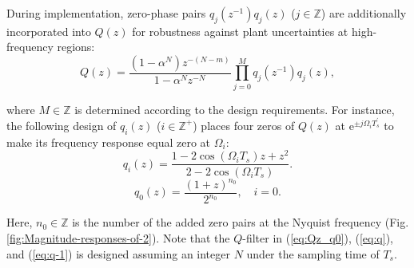 \documentclass [11pt, proquest] {uwthesis}[2020/02/24]
\begin{document}
During implementation, zero-phase pairs $q_{j}(z^{-1})q_{j}(z)$ ($j\in\mathbb{Z}$)
are additionally incorporated into $Q(z)$ for robustness against
plant uncertainties at high-frequency regions:
\begin{equation}
Q(z)=\frac{(1-\alpha^{N})z^{-(N-m)}}{1-\alpha^{N}z^{-N}}\prod_{j=0}^{M}q_{j}(z^{-1})q_{j}(z),\label{eq:Qz_q0}
\end{equation}

\noindent where $M\in\mathbb{Z}$ is determined according to the design
requirements. For instance, the following design of $q_{i}(z)$ ($i\in\mathbb{Z}^{+}$)
places four zeros of $Q(z)$ at $\text{e}^{\pm j\Omega_{i}T_{s}^{'}}$
to make its frequency response equal zero at $\Omega_{i}$: 
\noindent 
\begin{equation}
q_{i}(z)=\frac{1-2\cos(\Omega_{i}T_{s})z+z^{2}}{2-2\cos(\Omega_{i}T_{s})}.\label{eq:q}
\end{equation}
\noindent 
\begin{equation}
q_{0}(z)=\frac{(1+z)^{n_{0}}}{2^{n_{0}}},\quad i=0.\label{eq:q-1}
\end{equation}

\noindent Here, $n_{0}\in\mathbb{Z}$ is the number of the added zero
pairs at the Nyquist frequency (Fig. \ref{fig:Magnitude-responses-of-2}). Note that the $Q$-filter in (\ref{eq:Qz_q0}),
(\ref{eq:q}), and (\ref{eq:q-1}) is designed assuming an integer
$N$ under the sampling time of $T_{s}$.
\end{document}
